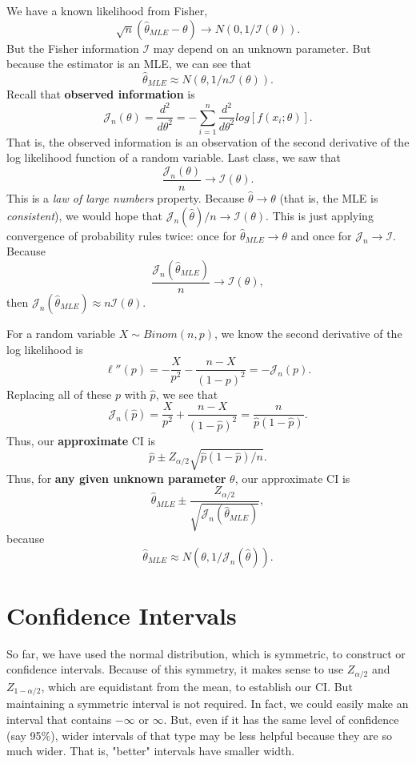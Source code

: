 \documentclass[titlepage, 12pt, leqno]{article}
\begin{document}
We have a known likelihood from Fisher,
\[
\sqrt{n}(\hat \theta_{MLE} - \theta) \rightarrow N(0, 1/\mathcal{I}(\theta)).
\]
But the Fisher information $\mathcal{I}$ may depend on an unknown parameter.
But because the estimator is an MLE, we can see that
\[
\hat \theta_{MLE} \approx N(\theta, 1/n\mathcal{I}(\theta)).
\]
Recall that \textbf{observed information} is
\[
\mathcal{J}_{n}(\theta) = \frac{d^{2}}{d \theta^{2}} =
-\sum_{i=1}^{n}\frac{d^{2}}{d \theta^{2}} log[f(x_{i};\theta)].
\]
That is, the observed information is an observation of the second derivative of
the log likelihood function of a random variable. Last class, we saw that
\[
\frac{\mathcal{J}_{n}(\theta)}{n} \rightarrow \mathcal{I}(\theta).
\]
This is a \textit{law of large numbers} property. Because $\hat \theta 
\rightarrow \theta$ (that is, the MLE is \textit{consistent}), we would hope
that $\mathcal{J}_{n}(\hat \theta)/n \rightarrow \mathcal{I}(\theta)$. This is
just applying convergence of probability rules twice: once for $\hat \theta_{MLE}
\rightarrow \theta$ and once for $\mathcal{J}_{n} \rightarrow \mathcal{I}$.
Because
\[
\frac{\mathcal{J}_{n}(\hat \theta_{MLE})}{n} \rightarrow \mathcal{I}(\theta),
\]
then $\mathcal{J}_{n}(\hat \theta_{MLE}) \approx n\mathcal{I}(\theta)$.

For a random variable $X \sim Binom(n,p)$, we know the second derivative of
the log likelihood is
\[
\ell''(p) = -\frac{X}{p^{2}} - \frac{n-X}{(1-p)^{2}} = -\mathcal{J}_{n}(p).
\]
Replacing all of these $p$ with $\hat p$, we see that
\[
\mathcal{J}_{n}(\hat p) = \frac{X}{p^{2}} + \frac{n-X}{(1-\hat p)^{2}} =
\frac{n}{\hat p(1-\hat p)}.
\]
Thus, our \textbf{approximate} CI is
\[
\hat p \pm Z_{\alpha/2}\sqrt{\hat p(1-\hat p)/n}.
\]
Thus, for \textbf{any given unknown parameter} $\theta$, our approximate CI
is
\[
\hat \theta_{MLE} \pm \frac{Z_{\alpha/2}}{\sqrt{\mathcal{J}_{n}(\hat \theta_{
MLE})}},
\]
because
\[
\hat \theta_{MLE} \approx N(\theta, 1/\mathcal{J}_{n}(\hat \theta)).
\]

\pagebreak
\section{Confidence Intervals}
So far, we have used the normal distribution, which is symmetric, to 
construct or confidence intervals. Because of this symmetry, it makes sense to
use $Z_{\alpha/2}$ and $Z_{1-\alpha/2}$, which are equidistant from the mean,
to establish our CI. But maintaining a symmetric interval is not required. In
fact, we could easily make an interval that contains $-\infty$ or $\infty$.
But, even if it has the same level of confidence (say 95\%), wider intervals of
that type may be less helpful because they are so much wider. That is, "better"
intervals have smaller width.
\end{document}
